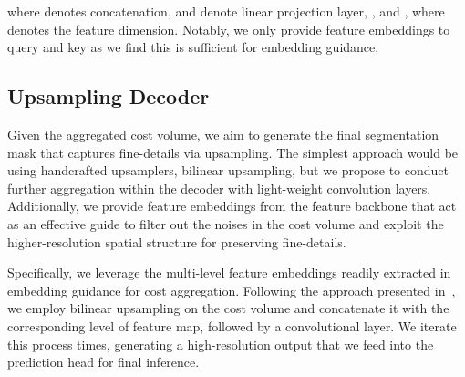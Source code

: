 \documentclass[10pt,twocolumn,letterpaper]{article}
\begin{document}
where  denotes concatenation,  and  denote linear projection layer, , and , where  denotes the feature dimension. Notably, we only provide  feature embeddings to query and key as we find this is sufficient for embedding guidance. 

\subsection{Upsampling Decoder}
Given the aggregated cost volume, we aim to generate the final segmentation mask that captures fine-details via upsampling. The simplest approach would be using handcrafted upsamplers, \ie bilinear upsampling, but we propose to conduct further aggregation within the
decoder with light-weight convolution layers. Additionally, we provide feature embeddings from the feature backbone 
that act as an effective guide to filter out the noises in the cost volume and exploit the higher-resolution spatial structure for preserving fine-details.

Specifically, we leverage the multi-level feature embeddings readily extracted in embedding guidance for cost aggregation. Following the approach presented in~\cite{hong2022cost}, we employ bilinear upsampling on the cost volume and concatenate it with the corresponding level of feature map, followed by a convolutional layer. We iterate this process  times, generating a high-resolution output that we feed into the prediction head for final inference.
\end{document}
